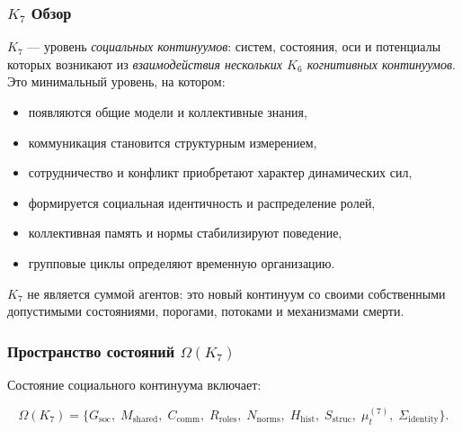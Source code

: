 

\subsubsection{\texorpdfstring{$K_7$}{K_7} Обзор}
\label{sec:k7-overview}

$K_7$ — уровень \emph{социальных континуумов}: систем, состояния,
оси и потенциалы которых возникают из \emph{взаимодействия нескольких $K_6$
когнитивных континуумов}. Это минимальный уровень, на котором:

\begin{itemize}
    \item появляются общие модели и коллективные знания,
    \item коммуникация становится структурным измерением,
    \item сотрудничество и конфликт приобретают характер динамических сил,
    \item формируется социальная идентичность и распределение ролей,
    \item коллективная память и нормы стабилизируют поведение,
    \item групповые циклы определяют временную организацию.
\end{itemize}

$K_7$ не является суммой агентов: это новый континуум со своими
собственными допустимыми состояниями, порогами, потоками и механизмами
смерти.

\subsubsection{Пространство состояний \texorpdfstring{$\Omega(K_7)$}{\Omega(K_7)}}

Состояние социального континуума включает:

\[
\Omega(K_7)=
\{
G_{\mathrm{soc}},\;
M_{\mathrm{shared}},\;
C_{\mathrm{comm}},\;
R_{\mathrm{roles}},\;
N_{\mathrm{norms}},\;
H_{\mathrm{hist}},\;
S_{\mathrm{struc}},\;
\mu^{(7)}_t,\;
\Sigma_{\mathrm{identity}}
\}.
\]

